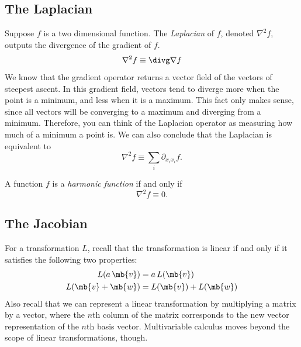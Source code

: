 \documentclass[11pt]{article}
\theoremstyle{definition}
\begin{document}
\subsection{The Laplacian}
 Suppose $f$ is a two dimensional function. The \textit{Laplacian} of $f$, denoted $\nabla^2 f$, outputs the divergence of the gradient of $f$.
$$
\nabla^2 f \equiv \divg \nabla f
$$
We know that the gradient operator returns a vector field of the vectors of steepest ascent. In this gradient field, vectors tend to diverge more when the point is a minimum, and less when it is a maximum. This fact only makes sense, since all vectors will be converging to a maximum and diverging from a minimum. Therefore, you can think of the Laplacian operator as measuring how much of a minimum a point is. We can also conclude that the Laplacian is equivalent to
$$
\nabla^2f\equiv\sum_i \partial_{x_ix_i}f.
$$


A function $f$ is a \textit{harmonic function} if and only if
$$
\nabla^2 f \equiv 0.
$$




\subsection{The Jacobian}
 For a transformation $L$, recall that the transformation is linear if and only if it satisfies the following two properties:
\begin{align*}
L(a\,\mb{v}) &= a\, L(\mb{v})\\
L(\mb{v} + \mb{w}) &= L(\mb{v}) + L(\mb{w})
\end{align*}
Also recall that we can represent a linear transformation by multiplying a matrix by a vector, where the $n$th column of the matrix corresponds to the new vector representation of the $n$th basis vector. Multivariable calculus moves beyond the scope of linear transformations, though. 
\end{document}
